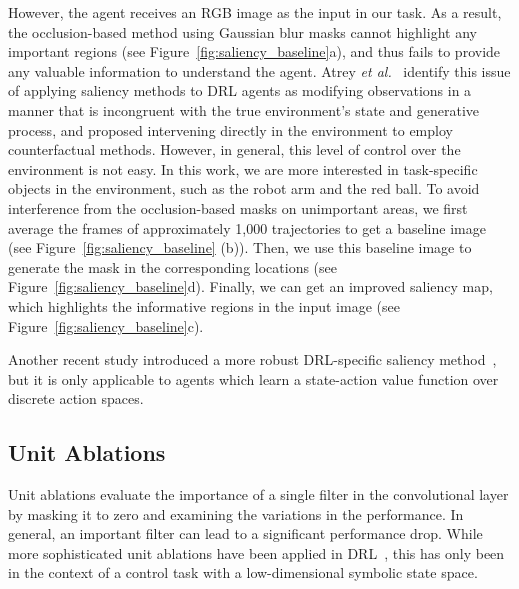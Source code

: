 However, the agent receives an RGB image as the input in our task. As a result, the occlusion-based method using Gaussian blur masks cannot highlight any important regions (see Figure~\ref{fig:saliency_baseline}a), and thus fails to provide any valuable information to understand the agent. Atrey \textit{et al.}~\cite{atrey2020exploratory} identify this issue of applying saliency methods to DRL agents as modifying observations in a manner that is incongruent with the true environment's state and generative process, and proposed intervening directly in the environment to employ counterfactual methods. However, in general, this level of control over the environment is not easy. In this work, we are more interested in task-specific objects in the environment, such as the robot arm and the red ball. To avoid interference from the occlusion-based masks on unimportant areas, we first average the frames of approximately 1,000 trajectories to get a baseline image (see Figure~\ref{fig:saliency_baseline} (b)). Then, we use this baseline image to generate the mask in the corresponding locations (see Figure~\ref{fig:saliency_baseline}d). Finally, we can get an improved saliency map, which highlights the informative regions in the input image  (see Figure~\ref{fig:saliency_baseline}c).

Another recent study introduced a more robust DRL-specific saliency method~\cite{puri2020explain}, but it is only applicable to agents which learn a state-action value function over discrete action spaces.
\subsection{Unit Ablations}
Unit ablations evaluate the importance of a single filter in the convolutional layer by masking it to zero and examining the variations in the performance. In general, an important filter can lead to a significant performance drop. While more sophisticated unit ablations have been applied in DRL~\cite{meyes2020you}, {this has only been in the context of a control task with a low-dimensional symbolic state space}.

